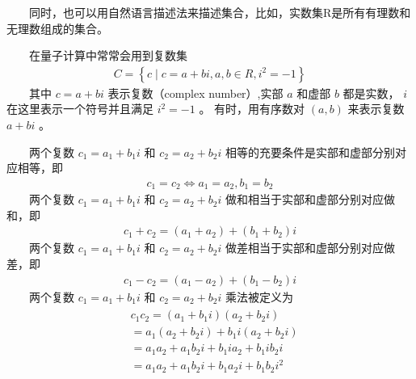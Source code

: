 \documentclass[a4paper,11pt,english]{sphinxmanual}
\begin{document}
\sphinxAtStartPar
​  同时，也可以用自然语言描述法来描述集合，比如，实数集R是所有有理数和无理数组成的集合。

\sphinxAtStartPar
​  在量子计算中常常会用到复数集
\begin{equation*}
\begin{split}C=\left\{c \mid c=a+b i, a, b \in R, i^{2}=-1\right\}\end{split}
\end{equation*}
\sphinxAtStartPar
  其中 \({c}= {a}+ {bi}\) 表示复数（complex number）,实部 \(a\) 和虚部 \(b\) 都是实数， \(i\) 在这里表示一个符号并且满足 \(i^{2}=-1\) 。 有时，用有序数对 \((a,b)\) 来表示复数 \({a}+b {i}\) 。

\sphinxAtStartPar
  两个复数 \(c_{1}=a_{1}+b_{1} i\) 和 \(c_{2}=a_{2}+b_{2} i\) 相等的充要条件是实部和虚部分别对应相等，即
\begin{equation*}
\begin{split}c_{1}=c_{2} \Leftrightarrow a_{1}=a_{2}, b_{1}=b_{2}\end{split}
\end{equation*}
\sphinxAtStartPar
​  两个复数 \(c_{1}=a_{1}+b_{1} i\) 和 \(c_{2}=a_{2}+b_{2} i\) 做和相当于实部和虚部分别对应做和，即
\begin{equation*}
\begin{split}c_{1}+c_{2}=\left(a_{1}+a_{2}\right)+\left(b_{1}+b_{2}\right) i\end{split}
\end{equation*}
\sphinxAtStartPar
​  两个复数 \(c_{1}=a_{1}+b_{1} i\) 和 \(c_{2}=a_{2}+b_{2} i\) 做差相当于实部和虚部分别对应做差，即
\begin{equation*}
\begin{split}c_{1}-c_{2}=\left(a_{1}-a_{2}\right)+\left(b_{1}-b_{2}\right) i\end{split}
\end{equation*}
\sphinxAtStartPar
  两个复数 \(c_{1}=a_{1}+b_{1} i\) 和 \(c_{2}=a_{2}+b_{2} i\) 乘法被定义为
\begin{equation*}
\begin{split}\begin{aligned} &c_{1} c_{2}=\left(a_{1}+b_{1} i\right)\left(a_{2}+b_{2} i\right) \\ &=a_{1}\left(a_{2}+b_{2} i\right)+b_{1} i\left(a_{2}+b_{2} i\right) \\ &=a_{1} a_{2}+a_{1} b_{2} i+b_{1} i a_{2}+b_{1} i b_{2} i \\ &=a_{1} a_{2}+a_{1} b_{2} i+b_{1} a_{2} i+b_{1} b_{2} i^{2} \end{aligned}\end{split}
\end{equation*}
\end{document}
